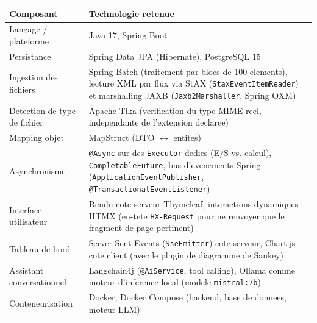 \begin{longtable}{@{}p{3.4cm}p{9.8cm}@{}}
\toprule
\textbf{Composant} & \textbf{Technologie retenue} \\
\midrule
\endhead
Langage / plateforme & Java 17, Spring Boot \\
Persistance & Spring Data JPA (Hibernate), PostgreSQL 15 \\
Ingestion des fichiers & Spring Batch (traitement par blocs de 100 elements),
lecture XML par flux via StAX (\texttt{StaxEventItemReader}) et marshalling
JAXB (\texttt{Jaxb2Marshaller}, Spring OXM) \\
Detection de type de fichier & Apache Tika (verification du type MIME reel,
independante de l'extension declaree) \\
Mapping objet & MapStruct (DTO $\leftrightarrow$ entites) \\
Asynchronisme & \texttt{@Async} sur des \texttt{Executor} dedies (E/S vs. calcul),
\texttt{CompletableFuture}, bus d'evenements Spring
(\texttt{ApplicationEventPublisher}, \texttt{@TransactionalEventListener}) \\
Interface utilisateur & Rendu cote serveur Thymeleaf, interactions dynamiques HTMX
(en-tete \texttt{HX-Request} pour ne renvoyer que le fragment de page pertinent) \\
Tableau de bord & Server-Sent Events (\texttt{SseEmitter}) cote serveur, Chart.js
cote client (avec le plugin de diagramme de Sankey) \\
Assistant conversationnel & Langchain4j (\texttt{@AiService}, tool calling),
Ollama comme moteur d'inference local (modele \texttt{mistral:7b}) \\
Conteneurisation & Docker, Docker Compose (backend, base de donnees, moteur LLM) \\
\bottomrule
\end{longtable}
